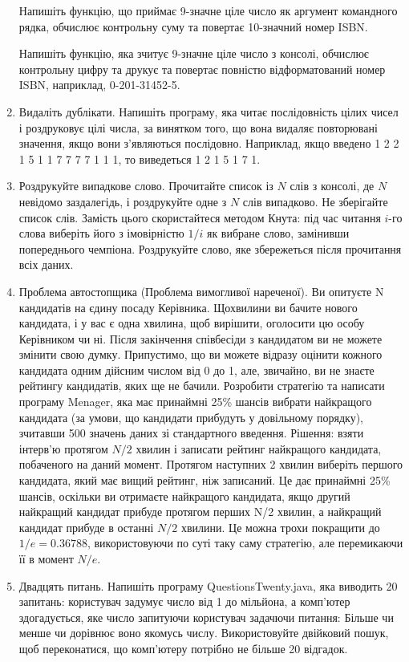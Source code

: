 \documentclass[]{article}
\begin{document}
\begin{enumerate}
Напишіть функцію, що приймає 9-значне ціле число як аргумент командного рядка, обчислює контрольну суму та
 повертає 10-значний номер ISBN. 

Напишіть функцію, яка зчитує 9-значне ціле число з консолі,
обчислює контрольну цифру та друкує та повертає повністю відформатований номер ISBN, наприклад, 0-201-31452-5.

\item Видаліть дублікати.
Напишіть програму, яка читає послідовність цілих чисел і роздруковує цілі числа,
за винятком того, що вона видаляє повторювані значення, якщо вони з’являються послідовно.
Наприклад, якщо введено 1 2 2 1 5 1 1 7 7 7 7 1 1 1, то виведеться 1 2 1 5 1 7 1.

\item Роздрукуйте випадкове слово. Прочитайте список із $N$ слів з консолі, де $N$ невідомо заздалегідь,
і роздрукуйте одне з $N$ слів випадково. Не зберігайте список слів.
Замість цього скористайтеся методом Кнута: під час читання $i$-го слова виберіть його з імовірністю $1/i$ як вибране слово,
замінивши попереднього чемпіона. Роздрукуйте слово, яке збережеться після прочитання всіх даних.

\item Проблема автостопщика (Проблема вимогливої нареченої). Ви опитуєте N кандидатів на єдину посаду Керівника.
Щохвилини ви бачите нового кандидата, і у вас є одна хвилина, щоб вирішити, оголосити цю особу Керівником чи ні.
Після закінчення співбесіди з кандидатом ви не можете змінити свою думку.
 Припустимо, що ви можете відразу оцінити кожного кандидата одним дійсним числом від 0 до 1, але, звичайно,
ви не знаєте рейтингу кандидатів, яких ще не бачили.
Розробити стратегію та написати програму Menager, яка має принаймні 25\% шансів вибрати найкращого кандидата 
(за умови, що кандидати прибудуть у довільному порядку), зчитавши 500 значень даних зі стандартного введення.
Рішення: взяти інтерв’ю протягом $N/2$ хвилин і записати рейтинг найкращого кандидата, побаченого на даний момент.
Протягом наступних 2 хвилин виберіть першого кандидата, який має вищий рейтинг, ніж записаний. Це дає принаймні 25\% шансів, оскільки ви отримаєте найкращого кандидата, якщо другий найкращий кандидат прибуде протягом перших N/2 хвилин,
а найкращий кандидат прибуде в останні $N/2$ хвилини. Це можна трохи покращити до $1/e = 0.36788$, використовуючи по суті таку саму стратегію, але перемикаючи її в момент $N/e$.

\item
Двадцять питань.
 Напишіть програму QuestionsTwenty.java, яка виводить 20 запитань:
 користувач задумує число від 1 до мільйона, а комп’ютер здогадується, яке число запитуючи користувач задачючи питання:
Більше чи менше чи дорівнює воно якомусь числу.
Використовуйте двійковий пошук, щоб переконатися, що комп’ютеру потрібно не більше 20 відгадок.



\end{enumerate}
\end{document}
